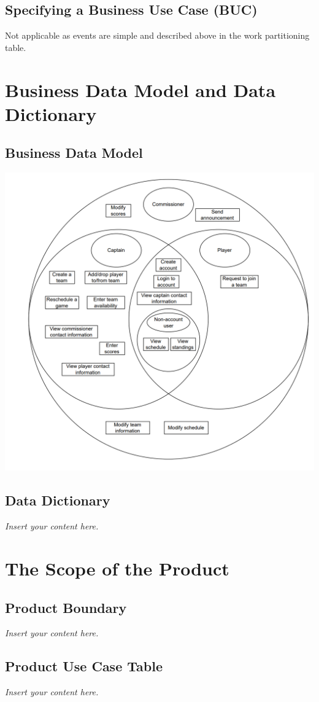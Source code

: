 \documentclass[12pt]{article}
\newcommand{\lips}{\textit{Insert your content here.}}
\begin{document}
\subsection{Specifying a Business Use Case (BUC)}
Not applicable as events are simple and described above
in the work partitioning table.

\section{Business Data Model and Data Dictionary}
\subsection{Business Data Model}
\includegraphics[scale=1.1]{business_data_model.png}
\subsection{Data Dictionary}
\lips

\section{The Scope of the Product}
\subsection{Product Boundary}
\lips
\subsection{Product Use Case Table}
\lips
\end{document}
